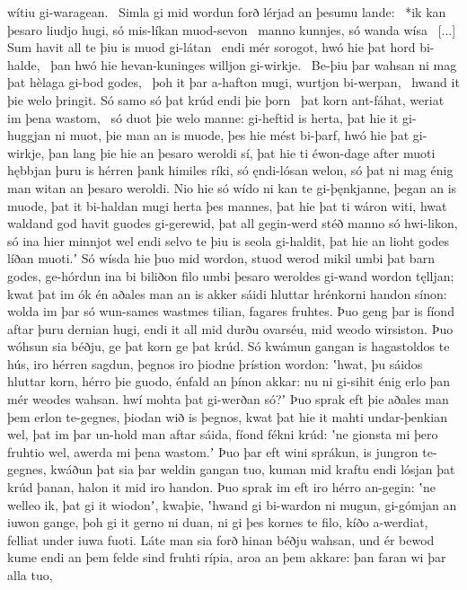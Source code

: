 wítiu gi-waragean. \hld\ Simla gi mid wordun forð
lérjad an þesumu lande: \hld\ *ik kan þesaro liudjo hugi,
só mis-líkan muod-sevon \hld\ manno kunnjes,
só wanda wísa \hld\ [...]
Sum havit all te þiu is muod gi-látan \hld\ endi mér sorogot,
hwó hie þat hord bi-halde, \hld\ þan hwó hie hevan-kuninges
willjon gi-wirkje. \hld\ Be-þiu þar wahsan ni mag
þat hèlaga gi-bod godes, \hld\ þoh it þar a-hafton mugi,
wurtjon bi-werpan, \hld\ hwand it þie welo þringit.
Só samo só þat krúd endi þie þorn \hld\ þat korn ant-fáhat,
weriat im þena wastom, \hld\ só duot þie welo manne:
gi-heftid is herta, þat hie it gi-huggjan ni muot,
þie man an is muode, þes hie mést bi-þarf,
hwó hie þat gi-wirkje, þan lang þie hie an þesaro weroldi sí,
þat hie ti éwon-dage after muoti
hębbjan þuru is hérren þank himiles ríki,
só ęndi-lósan welon, só þat ni mag énig man
witan an þesaro weroldi. Nio hie só wído ni kan
te gi-þęnkjanne, þegan an is muode,
þat it bi-haldan mugi herta þes mannes,
þat hie þat ti wáron witi, hwat waldand god havit
guodes gi-gerewid, þat all gegin-werd stéð
manno só hwi-likon, só ina hier minnjot wel
endi selvo te þiu is seola gi-haldit,
þat hie an lioht godes líðan muoti.ʼ
Só wísda hie þuo mid wordon, stuod werod mikil
umbi þat barn godes, ge-hórdun ina bi biliðon filo
umbi þesaro weroldes gi-wand wordon tęlljan;
kwat þat im ók én aðales man an is akker sáidi
hluttar hrénkorni handon sínon:
wolda im þar só wun-sames wastmes tilian,
fagares fruhtes. Þuo geng þar is fíond aftar
þuru dernian hugi, endi it all mid durðu ovarséu,
mid weodo wirsiston. Þuo wóhsun sia béðju,
ge þat korn ge þat krúd. Só kwámun gangan
is hagastoldos te hús, iro hérren sagdun,
þegnos iro þiodne þrístion wordon:
ʽhwat, þu sáidos hluttar korn, hérro þie guodo,
énfald an þínon akkar: nu ni gi-sihit énig erlo þan mér
weodes wahsan. hwí mohta þat gi-werðan só?ʼ
Þuo sprak eft þie aðales man þem erlon te-gegnes,
þiodan wið is þegnos, kwat þat hie it mahti undar-þenkian wel,
þat im þar un-hold man aftar sáida,
fíond fékni krúd: ʽne gionsta mi þero fruhtio wel,
awerda mi þena wastom.ʼ Þuo þar eft wini sprákun,
is jungron te-gegnes, kwáðun þat sia þar weldin gangan tuo,
kuman mid kraftu endi lósjan þat krúd þanan,
halon it mid iro handon. Þuo sprak im eft iro hérro an-gegin:
ʽne welleo ik, þat gi it wiodonʼ, kwaþie, ʽhwand gi bi-wardon ni mugun,
gi-gómjan an iuwon gange, þoh gi it gerno ni duan,
ni gi þes kornes te filo, kíðo a-werdiat,
felliat under iuwa fuoti. Láte man sia forð hinan
béðju wahsan, und ér bewod kume
endi an þem felde sind fruhti rípia,
aroa an þem akkare: þan faran wi þar alla tuo,
